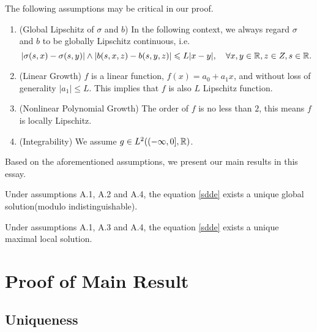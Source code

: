 \documentclass[8pt,onesided]{article}
\begin{document}
\begin{ass}
    The following assumptions may be critical in our proof.
\begin{enumerate}[{A}.1]
    \item (Global Lipschitz of $\sigma$ and $b$) In the following context, we always regard $\sigma$ and $b$ to be globally Lipschitz continuous, i.e.
\begin{equation*}
|\sigma(s,x)-\sigma(s,y)|\wedge |b(s,x,z)-b(s,y,z)|\leqslant L|x-y|, \quad\forall x,y\in \mathbb{R}, z\in Z, s\in \mathbb{R}.
\end{equation*}
     \item (Linear Growth) $f$ is a linear function, $f(x)=a_0+a_1x$, and without loss of generality $|a_1|\le L$. This implies that $f$ is also $L$ Lipschitz function.
     \item (Nonlinear Polynomial Growth) The order of $f$ is no less than $2$, this means $f$ is locally Lipschitz.
     \item (Integrability) We assume $g\in L^2((-\infty,0],\mathbb{R})$.
\end{enumerate}
\end{ass}

Based on the aforementioned assumptions, we present our main results in this essay.

\begin{theorem}[Global]
Under assumptions A.1, A.2 and A.4, the equation \ref{sdde} exists a unique global solution(modulo indistinguishable).
\end{theorem}

\begin{theorem}
[Local] Under assumptions A.1, A.3 and A.4, the equation \ref{sdde} exists a unique maximal local solution.
\end{theorem}


\section{Proof of Main Result}
\label{ss4}


\subsection{Uniqueness}
\end{document}
